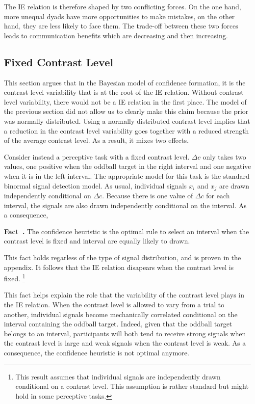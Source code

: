 \documentclass[12pt]{article}
\newcounter{example}[section]
\newenvironment{fact}[1][]{\refstepcounter{example}\par\medskip
   \noindent \textbf{Fact~\theexample. #1} \rmfamily}{\medskip}
\begin{document}
The IE relation is therefore shaped by two conflicting forces. On the one hand, more unequal dyads have more opportunities to make mistakes, on the other hand, they are less likely to face them. The trade-off between these two forces leads to communication benefits which are decreasing and then increasing. 


\subsection{Fixed Contrast Level}
This section argues that in the Bayesian model of confidence formation, it is the contrast level variability that is at the root of the IE relation. Without contrast level variability, there would not be a IE relation in the first place. The model of the previous section did not allow us to clearly make this claim because the prior was normally distributed. Using a normally distributed contrast level implies that a reduction in the contrast level variability goes together with a reduced strength of the average contrast level. As a result, it mixes two effects. 

Consider instead a perceptive task with a fixed contrast level. $\Delta c$ only takes two values, one positive when the oddball target in the right interval and one negative when it is in the left interval. The appropriate model for this task is the standard binormal signal detection model. As usual, individual signals $x_i$ and $x_j$ are drawn independently conditional on $\Delta c$. Because there is one value of $\Delta c$ for each interval, the signals are also drawn independently conditional on the interval. As a consequence,

\begin{fact}
The confidence heuristic is the optimal rule to select an interval when the contrast level is fixed and interval are equally likely to drawn. 
\end{fact}

This fact holds regarless of the type of signal distribution, and is proven in the appendix. It follows that the IE relation disapears when the contrast level is fixed. \footnote{This result assumes that individual signals are independently drawn conditional on a contrast level. This assumption is rather standard but might hold in some perceptive tasks.}

This fact helps explain the role that the variability of the contrast level plays in the IE relation. When the contrast level is allowed to vary from a trial to another, individual signals become mechanically correlated conditional on the interval containing the oddball target. Indeed, given that the oddball target belongs to an interval, participants will both tend to receive strong signals when the contrast level is large and weak signals when the contrast level is weak. As a consequence, the confidence heuristic is not optimal anymore.
\end{document}
